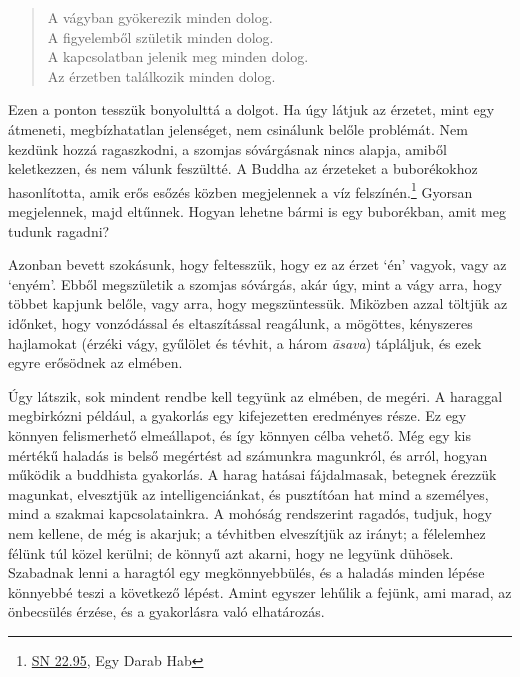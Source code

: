 \begin{quote}
A vágyban gyökerezik minden dolog.\\
A figyelemből születik minden dolog.\\
A kapcsolatban jelenik meg minden dolog.\\
Az érzetben találkozik minden dolog.

\bigskip

\end{quote}


Ezen a ponton tesszük bonyolulttá a dolgot. Ha úgy látjuk az érzetet,
mint egy átmeneti, megbízhatatlan jelenséget, nem csinálunk belőle
problémát. Nem kezdünk hozzá ragaszkodni, a szomjas sóvárgásnak nincs
alapja, amiből keletkezzen, és nem válunk feszültté. A Buddha az
érzeteket a buborékokhoz hasonlította, amik erős esőzés közben
megjelennek a víz felszínén.\footnote{\href{https://suttacentral.net/sn22.95}{SN
  22.95}, Egy Darab Hab} Gyorsan megjelennek, majd eltűnnek. Hogyan
lehetne bármi is egy buborékban, amit meg tudunk ragadni?

\enlargethispage*{\baselineskip}

Azonban bevett szokásunk, hogy feltesszük, hogy ez az érzet `én'
vagyok, vagy az `enyém'. Ebből megszületik a szomjas sóvárgás, akár úgy,
mint a vágy arra, hogy többet kapjunk belőle, vagy arra, hogy
megszüntessük. Miközben azzal töltjük az időnket, hogy vonzódással és
eltaszítással reagálunk, a mögöttes, kényszeres hajlamokat (érzéki vágy,
gyűlölet és tévhit, a három \emph{āsava}) tápláljuk, és ezek egyre
erősödnek az elmében.

Úgy látszik, sok mindent rendbe kell tegyünk az elmében, de megéri. A
haraggal megbirkózni például, a gyakorlás egy kifejezetten eredményes
része. Ez egy könnyen felismerhető elmeállapot, és így könnyen célba
vehető. Még egy kis mértékű haladás is belső megértést ad számunkra
magunkról, és arról, hogyan működik a buddhista gyakorlás. A harag
hatásai fájdalmasak, betegnek érezzük magunkat, elvesztjük az
intelligenciánkat, és pusztítóan hat mind a személyes, mind a szakmai
kapcsolatainkra. A mohóság rendszerint ragadós, tudjuk, hogy nem
kellene, de még is akarjuk; a tévhitben elveszítjük az irányt; a
félelemhez félünk túl közel kerülni; de könnyű azt akarni, hogy ne
legyünk dühösek. Szabadnak lenni a haragtól egy megkönnyebbülés, és a
haladás minden lépése könnyebbé teszi a következő lépést. Amint egyszer
lehűlik a fejünk, ami marad, az önbecsülés érzése, és a gyakorlásra való
elhatározás.

